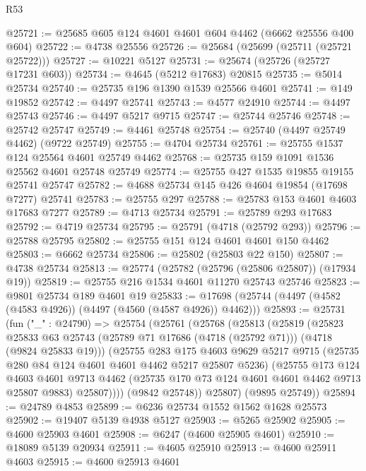 \begin{lexlean}{R53}
\begin{coremodule}
@25721 := @25685 @605 @124 @4601 @4601 @604 @4462 (@6662 @25556 @400 @604)
@25722 := @4738 @25556
@25726 := @25684 (@25699 (@25711 (@25721 @25722)))
@25727 := @10221 @5127
@25731 := @25674 (@25726 (@25727 @17231 @603))
@25734 := @4645 (@5212 @17683) @20815
@25735 := @5014 @25734
@25740 := @25735 @196 @1390 @1539 @25566 @4601
@25741 := @149 @19852
@25742 := @4497 @25741
@25743 := @4577 @24910
@25744 := @4497 @25743
@25746 := @4497 @5217 @9715
@25747 := @25744 @25746
@25748 := @25742 @25747
@25749 := @4461 @25748
@25754 := @25740 (@4497 @25749 @4462) (@9722 @25749)
@25755 := @4704 @25734
@25761 := @25755 @1537 @124 @25564 @4601 @25749 @4462
@25768 := @25735 @159 @1091 @1536 @25562 @4601 @25748 @25749
@25774 := @25755 @427 @1535 @19855 @19155 @25741 @25747
@25782 := @4688 @25734 @145 @426 @4604 @19854 (@17698 @7277) @25741
@25783 := @25755 @297
@25788 := @25783 @153 @4601 @4603 @17683 @7277
@25789 := @4713 @25734
@25791 := @25789 @293 @17683
@25792 := @4719 @25734
@25795 := @25791 (@4718 (@25792 @293))
@25796 := @25788 @25795
@25802 := @25755 @151 @124 @4601 @4601 @150 @4462
@25803 := @6662 @25734
@25806 := @25802 (@25803 @22 @150)
@25807 := @4738 @25734
@25813 := @25774 (@25782 (@25796 (@25806 @25807)) (@17934 @19))
@25819 := @25755 @216 @1534 @4601 @11270 @25743 @25746
@25823 := @9801 @25734 @189 @4601 @19
@25833 := @17698 (@25744 (@4497 (@4582 (@4583 @4926)) (@4497 (@4560 (@4587 @4926)) @4462)))
@25893 := @25731
    (fun ("_" : @24790) =>
    @25754
      (@25761
        (@25768
          (@25813
            (@25819
              (@25823
                @25833
                @63
                @25743
                (@25789 @71 @17686 (@4718 (@25792 @71)))
                (@4718 (@9824 @25833 @19)))
              (@25755
                @283
                @175
                @4603
                @9629
                @5217
                @9715
                (@25735 @280 @84 @124 @4601 @4601 @4462 @5217 @25807 @5236)
                (@25755
                  @173
                  @124
                  @4603
                  @4601
                  @9713
                  @4462
                  (@25735 @170 @73 @124 @4601 @4601 @4462 @9713 @25807 @9883)
                  @25807))))
          (@9842 @25748))
        @25807)
      (@9895 @25749))
@25894 := @24789 @4853
@25899 := @6236 @25734 @1552 @1562 @1628 @25573
@25902 := @19407 @5139 @4938 @5127
@25903 := @5265 @25902
@25905 := @4600 @25903 @4601
@25908 := @6247 (@4600 @25905 @4601)
@25910 := @18089 @5139 @20934
@25911 := @4605 @25910
@25913 := @4600 @25911 @4603
@25915 := @4600 @25913 @4601

\end{coremodule}
\end{lexlean}
